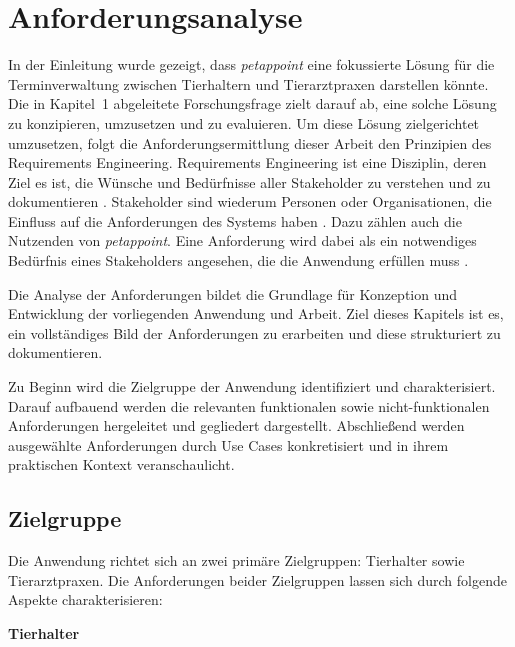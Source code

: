 \chapter{Anforderungsanalyse}
\label{chap:anforderungen}

In der Einleitung wurde gezeigt, dass \textit{petappoint} eine fokussierte Lösung für die Terminverwaltung zwischen Tierhaltern und Tierarztpraxen darstellen könnte. Die in Kapitel~1 abgeleitete Forschungsfrage zielt darauf ab, eine solche Lösung zu konzipieren, umzusetzen und zu evaluieren. Um diese Lösung zielgerichtet umzusetzen, folgt die Anforderungsermittlung dieser Arbeit den Prinzipien des Requirements Engineering. Requirements Engineering ist eine Disziplin, deren Ziel es ist, die Wünsche und Bedürfnisse aller Stakeholder zu verstehen und zu dokumentieren \cite[S.~3]{pohl2021}. Stakeholder sind wiederum Personen oder Organisationen, die Einfluss auf die Anforderungen des Systems haben \cite[S.~2]{pohl2021}. Dazu zählen auch die Nutzenden von \textit{petappoint}. Eine Anforderung wird dabei als ein notwendiges Bedürfnis eines Stakeholders angesehen, die die Anwendung erfüllen muss \cite[S.~1]{pohl2021}.

Die Analyse der Anforderungen bildet die Grundlage für Konzeption und Entwicklung der vorliegenden Anwendung und Arbeit. Ziel dieses Kapitels ist es, ein vollständiges Bild der Anforderungen zu erarbeiten und diese strukturiert zu dokumentieren.

Zu Beginn wird die Zielgruppe der Anwendung identifiziert und charakterisiert. Darauf aufbauend werden die relevanten funktionalen sowie nicht-funktionalen Anforderungen hergeleitet und gegliedert dargestellt. Abschließend werden ausgewählte Anforderungen durch Use Cases konkretisiert und in ihrem praktischen Kontext veranschaulicht.

\section{Zielgruppe}
Die Anwendung richtet sich an zwei primäre Zielgruppen: Tierhalter sowie Tierarztpraxen. Die Anforderungen beider Zielgruppen lassen sich durch folgende Aspekte charakterisieren:

\textbf{Tierhalter}

